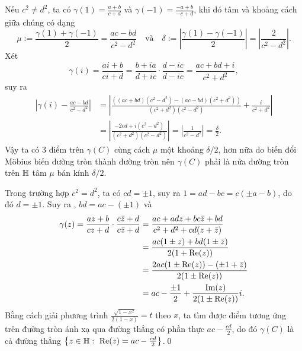 \startproof Nếu $c^2 \neq d^2$, ta có $\gamma(1) = \frac{a+b}{c+d}$ và $\gamma(-1) = \frac{-a+b}{-c+d}$, khi đó tâm và khoảng cách giữa chúng có dạng
$$
    \mu := \frac{\gamma(1) + \gamma(-1)}{2} = \frac{ac-bd}{c^{2} -d^{2}}\quad \text{và}\quad \delta := \left| \frac{\gamma(1) - \gamma(-1)}{2} \right| = \left| \frac{2}{c^2 - d^2} \right|.
$$
Xét
$$
    \gamma(i) = \frac{ai + b}{ci + d} = \frac{b+ia}{d+ic} \cdot \frac{d - ic}{d - ic} = \frac{ac + bd + i}{c^2 + d^2},
$$
suy ra
\begin{align*}
    \left| \gamma(i) - \frac{ac-bd}{c^2-d^2} \right| & = \left| \frac{((ac+bd)(c^2-d^2) - (ac-bd)(c^2+d^2))}{(c^2+d^2)(c^2-d^2)} + \frac{i}{c^2+d^2} \right|              \\
                                                     & = \left| \frac{-2cd+i(c^2-d^2)}{(c^2+d^2)(c^2-d^2)} \right| = \left| \frac{1}{c^2-d^2} \right| = \frac{\delta}{2}.
\end{align*}
Vậy ta có $3$ điểm trên $\gamma (C)$ cùng cách $\mu$ một khoảng $\delta/2$, hơn nữa do biến đổi Möbius biến đường tròn thành đường tròn nên $\gamma (C)$ phải là nửa đường tròn trên $\mathbb H$ tâm $\mu$ bán kính $\delta/2$.

Trong trường hợp $c^2 = d^2$, ta có $cd = \pm 1$, suy ra $1 = ad - bc = c(\pm a - b)$, do đó $d = \pm 1$. Suy ra , $bd = ac - (\pm 1)$ và
\begin{align*}
    \gamma(z) = \frac{az+b}{cz+d} \cdot \frac{c \bar{z} + d}{c\bar{z} + d} & = \frac{ac + adz + bc\bar{z} + bd}{c^2+d^2+cd(z+\bar{z})}           \\
                                                                           & = \frac{ac(1 \pm z) + bd(1 \pm \bar{z})}{2(1 + \operatorname{Re}(z))}           \\
                                                                           & = \frac{2ac(1 \pm \operatorname{Re}(z)) - (\pm 1 + \bar{z})}{2(1 \pm \operatorname{Re}(z))} \\
                                                                           & = ac - \frac{\pm 1}{2} + \frac{\operatorname{Im}(z)}{2(1 \pm \operatorname{Re}(z))}i.
\end{align*}
Bằng cách giải phương trình $\frac{\sqrt{1-x^2}}{2(1-x)} = t$ theo $x$, ta tìm được điểm tương ứng trên đường tròn ánh xạ qua đường thẳng có phần thực $ac - \frac{cd}{2}$, do đó $\gamma(C)$ là cả đường thẳng $\left\{z \in \mathbb H:\ \operatorname{Re}( z) =ac-\frac{cd}{2}\right\}$.\qed

